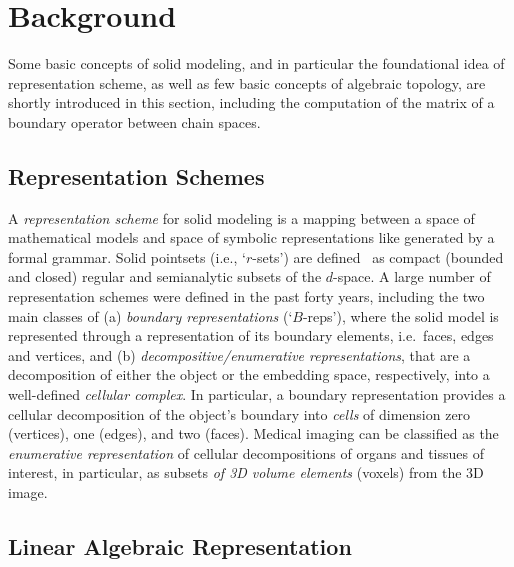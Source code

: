 
\section{Background}\label{sec:background}

Some basic concepts of solid modeling, and in particular the foundational idea of representation scheme, as well as few basic concepts of algebraic topology, are shortly introduced in this section, including the computation of the matrix of a boundary operator between chain spaces.

\subsection{Representation Schemes}\label{sec:schemes}

A \emph{representation scheme} for solid modeling is a mapping between a space of mathematical models and  space of symbolic representations like generated by a formal grammar.
Solid pointsets (i.e., `$r$-sets') are defined~\cite{Requicha:1980:RRS:356827.356833} as compact (bounded and closed) regular and semianalytic subsets of the $d$-space. A large number of representation schemes were defined in the past forty years, including the two main classes of (a) \emph{boundary representations} (`$B$-reps'), where the solid model is represented through a representation of its boundary elements, i.e.~faces, edges and vertices, and (b) \emph{decompositive/enumerative representations}, that are a decomposition of either the object or the embedding space, respectively, into a well-defined \emph{cellular complex}. In particular, a boundary representation provides a cellular decomposition of the object's boundary into \emph{cells} of dimension zero (vertices), one (edges), and two (faces). Medical imaging can be classified as the \emph{enumerative representation} of cellular decompositions of organs and tissues of interest, in particular, as subsets \emph{of 3D volume elements} (voxels) from the 3D image. 


\subsection{Linear Algebraic Representation}\label{sec:lar}


